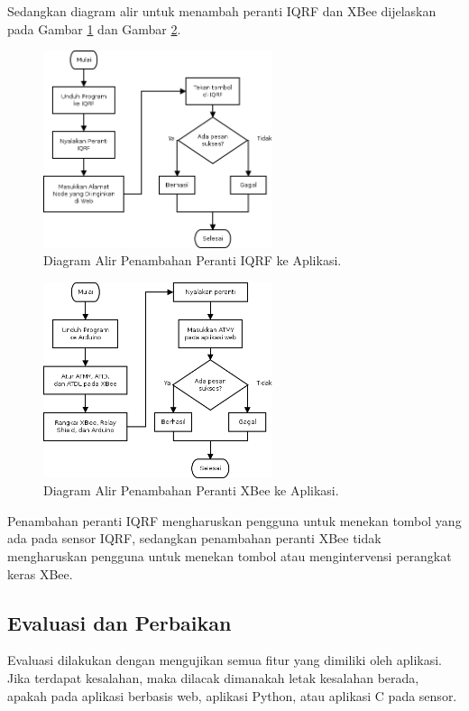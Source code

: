 			Sedangkan diagram alir untuk menambah peranti IQRF dan XBee dijelaskan pada Gambar \ref{add-iqrf} dan Gambar \ref{add-xbee}.

			\begin{figure}[H]
			  \centering
			    \includegraphics[width=0.6\textwidth]{gambar/add-iqrf}
			    \caption{Diagram Alir Penambahan Peranti IQRF ke Aplikasi.}
			    \label{add-iqrf}
			\end{figure}

			\begin{figure}[H]
			  \centering
			    \includegraphics[width=0.6\textwidth]{gambar/add-xbee}
			    \caption{Diagram Alir Penambahan Peranti XBee ke Aplikasi.}
			    \label{add-xbee}
			\end{figure}

			Penambahan peranti IQRF mengharuskan pengguna untuk menekan tombol yang ada pada sensor IQRF, sedangkan penambahan peranti XBee tidak mengharuskan pengguna untuk menekan tombol atau mengintervensi perangkat keras XBee.

		\subsection{Evaluasi dan Perbaikan}
			Evaluasi dilakukan dengan mengujikan semua fitur yang dimiliki oleh aplikasi. Jika terdapat kesalahan, maka dilacak dimanakah letak kesalahan berada, apakah pada aplikasi berbasis web, aplikasi Python, atau aplikasi C pada sensor.

